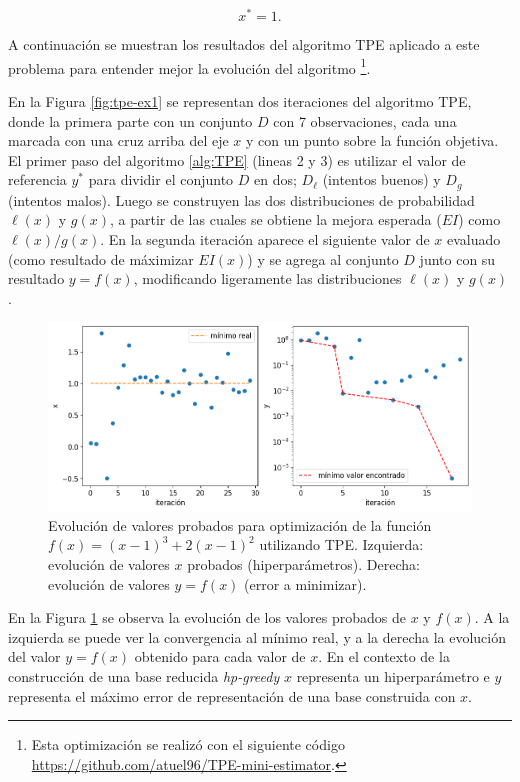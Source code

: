  \[x^* = 1.\]

A continuación se muestran los resultados del algoritmo TPE aplicado a este problema para entender mejor la evolución del algoritmo \footnote{Esta optimización se realizó con el siguiente código \url{https://github.com/atuel96/TPE-mini-estimator}.}.

En la Figura \ref{fig:tpe-ex1} se representan dos iteraciones del algoritmo TPE, donde la primera parte con un conjunto $D$ con 7 observaciones, cada una marcada con una cruz arriba del eje $x$ y con un punto sobre la función objetiva. El primer paso del algoritmo \ref{alg:TPE} (lineas 2 y 3) es utilizar el valor de referencia $y^*$ para dividir el conjunto $D$ en dos; $D_{\ell}$ (intentos buenos) y $D_g$ (intentos malos). Luego se construyen las dos distribuciones de probabilidad $\ell(x)$ y $g(x)$, a partir de las cuales se obtiene la mejora esperada ($EI$) como $\ell(x)/g(x)$. En la segunda iteración aparece el siguiente valor de $x$ evaluado (como resultado de máximizar $EI(x)$) y se agrega al conjunto $D$ junto con su resultado $y = f(x)$, modificando ligeramente las distribuciones $\ell(x)$ y $g(x)$. 


\begin{figure}[h!]
\centering
\includegraphics[width=1\columnwidth]{figs//tpe-example-results.png}
\caption{Evolución de valores probados para optimización de la función $f(x) = (x-1)^3 + 2(x-1)^2$ utilizando TPE. Izquierda: evolución de valores $x$ probados (hiperparámetros). Derecha: evolución de valores $y=f(x)$ (error a minimizar). }
\label{fig:tpe-ex-res}
\end{figure}


En la Figura \ref{fig:tpe-ex-res} se observa la evolución de los valores probados de $x$ y $f(x)$. A la izquierda se puede ver la convergencia al mínimo real, y a la derecha la evolución del valor $y = f(x)$ obtenido para cada valor de $x$. En el contexto de la construcción de una base reducida \textit{hp-greedy} $x$ representa un hiperparámetro e $y$ representa el máximo error de representación de una base construida con $x$.

